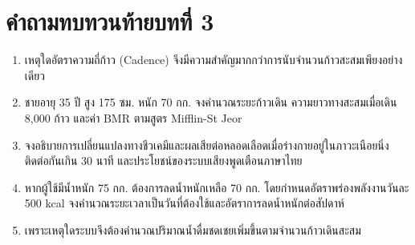 \section*{คำถามทบทวนท้ายบทที่ 3}
\begin{enumerate}
    \item เหตุใดอัตราความถี่ก้าว (Cadence) จึงมีความสำคัญมากกว่าการนับจำนวนก้าวสะสมเพียงอย่างเดียว
    \item ชายอายุ 35 ปี สูง 175 ซม. หนัก 70 กก. จงคำนวณระยะก้าวเดิน ความยาวทางสะสมเมื่อเดิน 8,000 ก้าว และค่า BMR ตามสูตร Mifflin-St Jeor
    \item จงอธิบายการเปลี่ยนแปลงทางชีวเคมีและผลเสียต่อหลอดเลือดเมื่อร่างกายอยู่ในภาวะเนือยนิ่งติดต่อกันเกิน 30 นาที และประโยชน์ของระบบเสียงพูดเตือนภาษาไทย
    \item หากผู้ใช้มีน้ำหนัก 75 กก. ต้องการลดน้ำหนักเหลือ 70 กก. โดยกำหนดอัตราพร่องพลังงานวันละ 500 kcal จงคำนวณระยะเวลาเป็นวันที่ต้องใช้และอัตราการลดน้ำหนักต่อสัปดาห์
    \item เพราะเหตุใดระบบจึงต้องคำนวณปริมาณน้ำดื่มชดเชยเพิ่มขึ้นตามจำนวนก้าวเดินสะสม
\end{enumerate}
\clearpage

